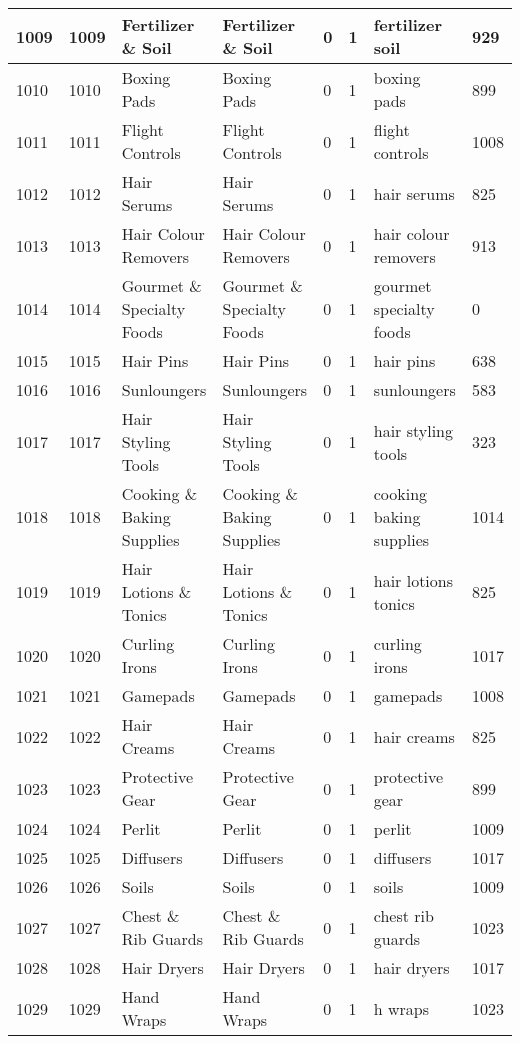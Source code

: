 \begin{longtable}{|l|l|l|l|l|l|l|l|}
1009 & 1009 & Fertilizer \& Soil & Fertilizer \& Soil & 0 & 1 & fertilizer soil & 929 \\ \hline 
1010 & 1010 & Boxing Pads & Boxing Pads & 0 & 1 & boxing pads & 899 \\ \hline 
1011 & 1011 & Flight Controls & Flight Controls & 0 & 1 & flight controls & 1008 \\ \hline 
1012 & 1012 & Hair Serums & Hair Serums & 0 & 1 & hair serums & 825 \\ \hline 
1013 & 1013 & Hair Colour Removers & Hair Colour Removers & 0 & 1 & hair colour removers & 913 \\ \hline 
1014 & 1014 & Gourmet \& Specialty Foods & Gourmet \& Specialty Foods & 0 & 1 & gourmet specialty foods & 0 \\ \hline 
1015 & 1015 & Hair Pins & Hair Pins & 0 & 1 & hair pins & 638 \\ \hline 
1016 & 1016 & Sunloungers & Sunloungers & 0 & 1 & sunloungers & 583 \\ \hline 
1017 & 1017 & Hair Styling Tools & Hair Styling Tools & 0 & 1 & hair styling tools & 323 \\ \hline 
1018 & 1018 & Cooking \& Baking Supplies & Cooking \& Baking Supplies & 0 & 1 & cooking baking supplies & 1014 \\ \hline 
1019 & 1019 & Hair Lotions \& Tonics & Hair Lotions \& Tonics & 0 & 1 & hair lotions tonics & 825 \\ \hline 
1020 & 1020 & Curling Irons & Curling Irons & 0 & 1 & curling irons & 1017 \\ \hline 
1021 & 1021 & Gamepads & Gamepads & 0 & 1 & gamepads & 1008 \\ \hline 
1022 & 1022 & Hair Creams & Hair Creams & 0 & 1 & hair creams & 825 \\ \hline 
1023 & 1023 & Protective Gear & Protective Gear & 0 & 1 & protective gear & 899 \\ \hline 
1024 & 1024 & Perlit & Perlit & 0 & 1 & perlit & 1009 \\ \hline 
1025 & 1025 & Diffusers & Diffusers & 0 & 1 & diffusers & 1017 \\ \hline 
1026 & 1026 & Soils & Soils & 0 & 1 & soils & 1009 \\ \hline 
1027 & 1027 & Chest \& Rib Guards & Chest \& Rib Guards & 0 & 1 & chest rib guards & 1023 \\ \hline 
1028 & 1028 & Hair Dryers & Hair Dryers & 0 & 1 & hair dryers & 1017 \\ \hline 
1029 & 1029 & Hand Wraps & Hand Wraps & 0 & 1 & h wraps & 1023 \\ \hline 

\end{longtable}
